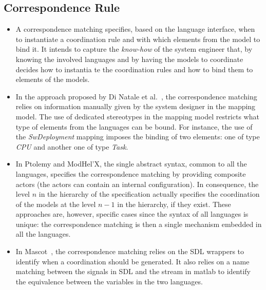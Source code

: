 \subsection{Correspondence Rule}
		\begin{itemize}
			\item A correspondence matching specifies, based on the language interface, when to instantiate a coordination rule and with which elements from the model to bind it.
			It intends to capture the \emph{know-how} of the system engineer that, by knowing the involved languages and by having the models to coordinate decides how to instantia           te the coordination rules and how to bind them to elements of the models.
			
			\item In the approach proposed by Di Natale et al.~\cite{dinatale}, the correspondence matching relies on information manually given by the system designer in the mapping model. The use of dedicated stereotypes in the mapping model restricts what type of elements from the languages can be bound. For instance, the use of the \emph{SwDeployment} mapping imposes the binding of two elements: one of type \emph{CPU} and another one of type \emph{Task}. 			
			\item In Ptolemy and ModHel'X, the single abstract syntax, common to all the languages, specifies the correspondence matching by providing composite actors (\ie the actors can contain an internal configuration). In consequence, the level $n$ in the hierarchy of the specification actually specifies the coordination of the models at the level $n-1$ in the hierarchy, if they exist. These approaches are, however, specific cases since the syntax of all languages is unique: the correspondence matching is then a single mechanism embedded in all the languages.
			
			\item In Mascot~\cite{mascotbib}, the correspondence matching relies on the SDL wrappers to identify when a coordination should be generated. It also relies on a name matching between the signals in SDL and the stream in matlab to identify the equivalence between the variables in the two languages. 
		\end{itemize}

